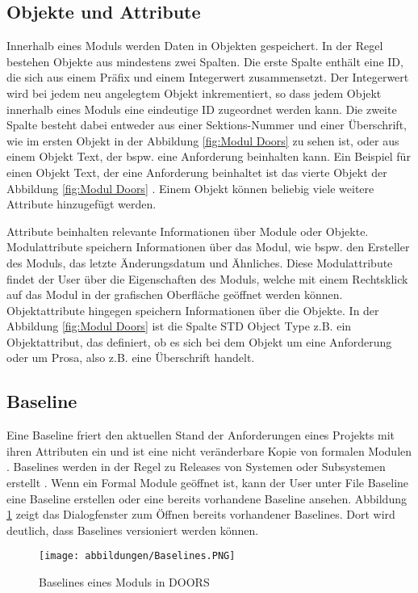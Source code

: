 \subsection{Objekte und Attribute}
Innerhalb eines Moduls werden Daten in Objekten gespeichert. In der Regel bestehen Objekte aus mindestens zwei Spalten. Die erste 
Spalte enthält eine ID, die sich aus einem Präfix und einem Integerwert zusammensetzt. Der Integerwert wird bei jedem neu angelegtem 
Objekt inkrementiert, so dass jedem Objekt innerhalb eines Moduls eine eindeutige ID zugeordnet werden kann.
Die zweite Spalte besteht dabei entweder aus einer Sektions-Nummer und einer Überschrift, wie im ersten Objekt in der Abbildung 
\ref*{fig:Modul Doors} zu sehen ist, oder aus einem Objekt Text, der bspw. eine Anforderung beinhalten kann. Ein Beispiel für 
einen Objekt Text, der eine Anforderung beinhaltet ist das vierte Objekt der Abbildung \ref*{fig:Modul Doors} \cite[S.178]{DOORS}.
Einem Objekt können beliebig viele weitere Attribute hinzugefügt werden. 

Attribute beinhalten relevante Informationen über Module oder Objekte. Modulattribute speichern Informationen über das Modul, wie bspw.
den Ersteller des Moduls, das letzte Änderungsdatum und Ähnliches. Diese Modulattribute findet der User über die Eigenschaften des Moduls, 
welche mit einem Rechtsklick auf das Modul in der grafischen Oberfläche geöffnet werden können. Objektattribute hingegen
speichern Informationen über die Objekte. In der Abbildung \ref*{fig:Modul Doors} ist die Spalte STD Object Type z.B. ein Objektattribut,
das definiert, ob es sich bei dem Objekt um eine Anforderung oder um Prosa, also z.B. eine Überschrift handelt.

\subsection{Baseline}
Eine Baseline friert den aktuellen Stand der Anforderungen eines Projekts mit ihren Attributen ein und ist eine nicht veränderbare Kopie von 
formalen Modulen \cite[S.182]{DOORS}. Baselines werden in der Regel zu Releases von Systemen oder Subsystemen erstellt \cite[S.60]{RM-PE}. 
Wenn ein Formal Module geöffnet ist, kann der User unter File \textrightarrow{} Baseline eine Baseline erstellen oder eine bereits vorhandene 
Baseline ansehen. Abbildung \ref*{fig:Baselines} zeigt das Dialogfenster zum Öffnen bereits vorhandener Baselines. Dort wird deutlich, 
dass Baselines versioniert werden können.

\begin{figure}[h]
    \centering
    \texttt{[image: abbildungen/Baselines.PNG]}
    \caption{Baselines eines Moduls in \acs{DOORS}}
    \label{fig:Baselines}
\end{figure}

